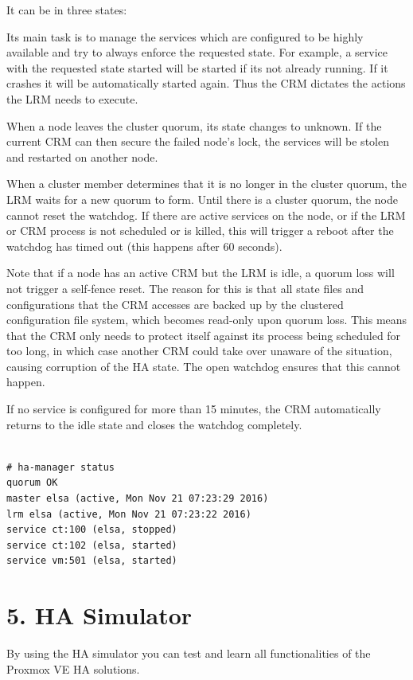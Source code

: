 It can be in three states:

Its main task is to manage the services which are configured to be highly available and try to always enforce the requested state. For example, a service with the requested state started will be started if its not already running. If it crashes it will be automatically started again. Thus the CRM dictates the actions the LRM needs to execute.

When a node leaves the cluster quorum, its state changes to unknown. If the current CRM can then secure the failed node’s lock, the services will be stolen and restarted on another node.

When a cluster member determines that it is no longer in the cluster quorum, the LRM waits for a new quorum to form. Until there is a cluster quorum, the node cannot reset the watchdog. If there are active services on the node, or if the LRM or CRM process is not scheduled or is killed, this will trigger a reboot after the watchdog has timed out (this happens after 60 seconds).

Note that if a node has an active CRM but the LRM is idle, a quorum loss will not trigger a self-fence reset. The reason for this is that all state files and configurations that the CRM accesses are backed up by the clustered configuration file system, which becomes read-only upon quorum loss. This means that the CRM only needs to protect itself against its process being scheduled for too long, in which case another CRM could take over unaware of the situation, causing corruption of the HA state. The open watchdog ensures that this cannot happen.

If no service is configured for more than 15 minutes, the CRM automatically returns to the idle state and closes the watchdog completely.

\begin{lstlisting}

# ha-manager status
quorum OK
master elsa (active, Mon Nov 21 07:23:29 2016)
lrm elsa (active, Mon Nov 21 07:23:22 2016)
service ct:100 (elsa, stopped)
service ct:102 (elsa, started)
service vm:501 (elsa, started)

\end{lstlisting}


\section{5. HA Simulator}

By using the HA simulator you can test and learn all functionalities of the Proxmox VE HA solutions.


